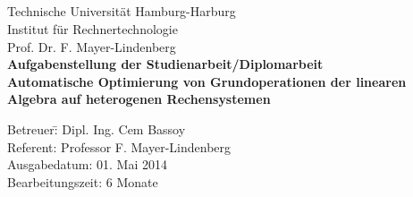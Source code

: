 
\begin{center} \section*{} \end{center}
\thispagestyle{empty}           %
{

\setlength{\parindent}{0mm}     %
\setlength{\topmargin}{1mm}
\setlength{\topskip}{1mm}
\setlength{\headheight}{1mm}
\setlength{\headsep}{1mm}


\begin{center}
		 Technische Universität Hamburg-Harburg\\
		 Institut für Rechnertechnologie\\
		 Prof. Dr. F. Mayer-Lindenberg\\[10mm]
		 \textbf{Aufgabenstellung der Studienarbeit/Diplomarbeit\\[2,5mm]
		 \large Automatische Optimierung von Grundoperationen der 
linearen Algebra auf heterogenen Rechensystemen}
\end{center}


\small {} 




\begin{tabbing}
  Betreuer\quad\quad\quad\quad\=: Dipl. Ing. Cem Bassoy\\
  Referent\>: Professor F. Mayer-Lindenberg \\
  Ausgabedatum\>: 01. Mai 2014\\
  Bearbeitungszeit\>: 6 Monate
\end{tabbing}

}
\newpage

